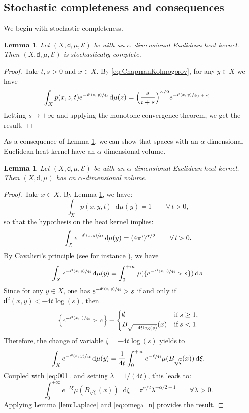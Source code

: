 \documentclass[10pt]{amsart}
\theoremstyle{plain}
\newtheorem{lemma}[theorem]{Lemma}
\theoremstyle{definition}
\newcommand{\cE}{\mathcal{E}}
\newcommand{\di}{\mathop{}\!\mathrm{d}}
\newcommand{\dist}{\mathsf{d}}
\begin{document}
\subsection{Stochastic completeness and consequences}

We begin with stochastic completeness.

\begin{lemma}\label{lem:stochastic}
Let $(X,\dist,\mu,\cE)$ be with an $\alpha$-dimensional Euclidean heat kernel.
Then $(X,\dist,\mu,\cE)$ is stochastically complete.
\end{lemma}

\begin{proof}
Take $t,s>0$ and $x \in X$. By \eqref{eq:ChapmanKolmogorov}, for any $y \in X$ we have
\begin{equation}\label{eq:Lem3.1}
\int_X p(x,z,t)e^{-\sfrac{\dist^2(z,y)}{4s}} \di \mu(z) = \Bigl(\frac{s}{t+s}\Bigr)^{\alpha/2} e^{-\sfrac{\dist^2(x,y)}{4(t+s)}}.
\end{equation}
Letting $s \to +\infty$ and applying the monotone convergence theorem, we get the result.
\end{proof}

As a consequence of Lemma \ref{lem:stochastic}, we can show that spaces with an $\alpha$-dimensional Euclidean heat kernel have an $\alpha$-dimensional volume.

\begin{lemma}\label{lem:euclideanvolume}
Let $(X,\dist,\mu,\cE)$ be with an $\alpha$-dimensional Euclidean heat kernel. Then $(X,\dist,\mu)$ has an $\alpha$-dimensional volume.
\end{lemma}

\begin{proof}
Take $x \in X$. By Lemma \ref{lem:stochastic}, we have:
\[
\int_X p(x,y,t) \di \mu(y) = 1 \qquad \forall \, t>0,
\]
so that the hypothesis on the heat kernel implies:
\begin{equation}\label{eq:001}
\int_X e^{-\sfrac{\dist^2(x,y)}{4t}} \di \mu(y) = (4\pi t)^{\alpha/2} \qquad \forall \, t>0.
\end{equation}
By Cavalieri's principle (see for instance \cite[Lem.\,5.2.1]{AmbrosioTilli}), we have
\[
\int_X e^{-\sfrac{\dist^2(x,y)}{4t}}\di \mu(y) = \int_0^{+\infty} \mu(\{e^{-\sfrac{\dist^2(x,\cdot)}{4t}}>s\}) \di s.
\]
Since for any $y \in X$, one has $e^{-\sfrac{\dist^2(x,y)}{4t}}>s$ if and only if $\dist^2(x,y) < - 4t \log(s)$, then
\[
\Bigl\{e^{-\sfrac{\dist^2(x,\cdot)}{4t}}>s\Bigr\}
= \begin{cases}
\emptyset & \text{if $s\ge 1$},\\
B_{\sqrt{-4t\log(s)}}(x) & \text{if $s<1$}.
\end{cases}
\]
Therefore, the change of variable $\xi=-4t\log(s)$ yields to
\[
\int_X e^{-\sfrac{\dist^2(x,y)}{4t}}\di \mu(y) = \frac{1}{4t} \int_0^{+\infty} e^{-\sfrac{\xi}{4t}} \mu(B_{\sqrt{\xi}}(x)) \di \xi.
\]
Coupled with \eqref{eq:001}, and setting $\lambda=1/(4t)$, this leads to:
\[
\int_0^{+\infty} e^{-\lambda \xi} \mu(B_{\sqrt{\xi}}(x)) \di \xi = \pi^{\alpha/2} \lambda^{-\alpha/2-1} \qquad \forall \lambda>0.
\]
Applying Lemma \ref{lem:Laplace} and \eqref{eq:omega_n} provides the result.
\end{proof}
\end{document}
